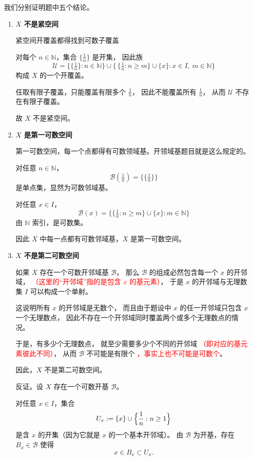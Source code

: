 \begin{solution}
我们分别证明题中五个结论。

\begin{enumerate}
\item \textbf{$X$ 不是紧空间}
\begin{dxtips}
    紧空间开覆盖都得找到可数子覆盖
\end{dxtips}
对每个 $n\in\mathbb{N}$，集合 $\{\tfrac{1}{n}\}$ 是开集，
因此族
\[
\mathcal{U}
=
\bigl\{\{\tfrac{1}{n}\}:n\in\mathbb{N}\bigr\}
\cup
\bigl\{\,\{\tfrac{1}{n}:n\ge m\}\cup\{x\}:x\in I,\ m\in\mathbb{N}\bigr\}
\]
构成 $X$ 的一个开覆盖。

任取有限子覆盖，只能覆盖有限多个 $\tfrac{1}{n}$，
因此不能覆盖所有 $\tfrac{1}{n}$，
从而 $\mathcal{U}$ 不存在有限子覆盖。

故 $X$ 不是紧空间。

\item \textbf{$X$ 是第一可数空间}
\begin{dxtips}
    第一可数空间，每一个点都得有可数领域基。开领域基题目就是这么规定的。
\end{dxtips}
对任意 $n\in\mathbb{N}$，
\[
\mathcal{B}\!\left(\tfrac{1}{n}\right)=\bigl\{\{\tfrac{1}{n}\}\bigr\}
\]
是单点集，显然为可数邻域基。

对任意 $x\in I$，
\[
\mathcal{B}(x)
=
\bigl\{\{\tfrac{1}{n}:n\ge m\}\cup\{x\}:m\in\mathbb{N}\bigr\}
\]
由 $\mathbb{N}$ 索引，是可数集。

因此 $X$ 中每一点都有可数邻域基，$X$ 是第一可数空间。

\item \textbf{$X$ 不是第二可数空间}
\begin{dxtips}
  如果 $X$ 存在一个可数开邻域基 $\mathcal B$，
那么 $\mathcal B$ 的组成必然包含每一个 $x$ 的开邻域，
\textcolor{red}{（这里的“开邻域”指的是包含 $x$ 的基元素）}，
于是 $x$ 的开邻域与无理数集 $I$ 可以构成一个单射。

这说明所有 $x$ 的开邻域是无数个，
而且由于题设中 $x$ 的任一开邻域只包含 $x$ 一个无理数点，
因此不存在一个开邻域同时覆盖两个或多个无理数点的情况。

于是，有多少个无理数点，
就至少需要多少个不同的开邻域
\textcolor{red}{（即对应的基元素彼此不同）}，
从而 $\mathcal B$ 不可能是有限个
\textcolor{red}{，事实上也不可能是可数个}。

因此，$X$ 不是第二可数空间。 
\end{dxtips}
反证。设 $X$ 存在一个可数开基 $\mathcal{B}$。

对任意 $x\in I$，集合
\[
U_x:=\{x\}\cup\Bigl\{\frac1n:n\ge 1\Bigr\}
\]
是含 $x$ 的开集（因为它就是 $x$ 的一个基本开邻域）。
由 $\mathcal{B}$ 为开基，存在 $B_x\in\mathcal{B}$ 使得
\[
x\in B_x\subset U_x.
\]


\end{enumerate}
\end{solution}
